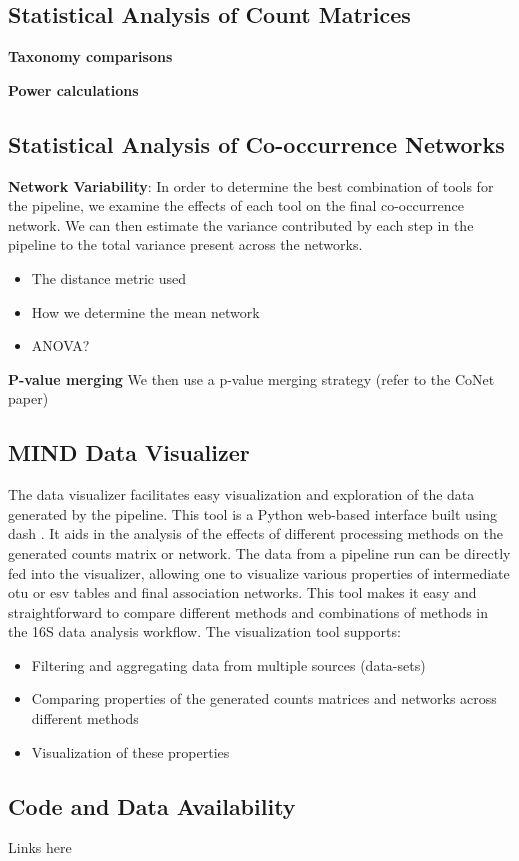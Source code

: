   \subsection*{Statistical Analysis of Count Matrices}

   \textbf{Taxonomy comparisons}

    \textbf{Power calculations}

  \subsection*{Statistical Analysis of Co-occurrence Networks}

    \textbf{Network Variability}:
    In order to determine the best combination of tools for the pipeline, we examine the effects of each tool on the final co-occurrence network.
    We can then estimate the variance contributed by each step in the pipeline to the total variance present across the networks.
    \begin{itemize}
      \item The distance metric used
      \item How we determine the mean network
      \item ANOVA?
    \end{itemize}

    \textbf{P-value merging}
    We then use a p-value merging strategy (refer to the CoNet paper)

  \subsection*{MIND Data Visualizer}

    The data visualizer facilitates easy visualization and exploration of the data generated by the pipeline.
    This tool is a Python web-based interface built using dash \cite{dash}.
    It aids in the analysis of the effects of different processing methods on the generated counts matrix or network.
    The data from a pipeline run can be directly fed into the visualizer, allowing one to visualize various properties of intermediate \ac{otu} or \ac{esv} tables and final association networks.
    This tool makes it easy and straightforward to compare different methods and combinations of methods in the 16S data analysis workflow.
    The visualization tool supports:
    \begin{itemize}
      \item Filtering and aggregating data from multiple sources (data-sets)
      \item Comparing properties of the generated counts matrices and networks across different methods
      \item Visualization of these properties
    \end{itemize}

  \subsection*{Code and Data Availability}

    Links here
